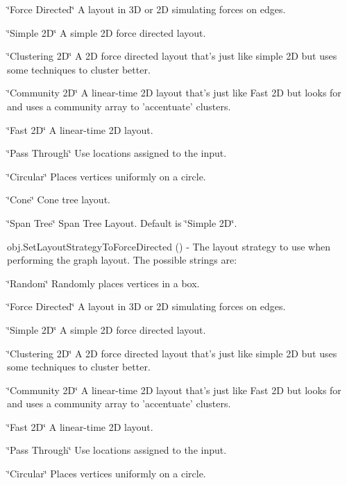 \begin{DoxyItemize}
\begin{DoxyItemize}
\item \char`\"{}\-Force Directed\char`\"{} A layout in 3\-D or 2\-D simulating forces on edges.
\item \char`\"{}\-Simple 2\-D\char`\"{} A simple 2\-D force directed layout.
\item \char`\"{}\-Clustering 2\-D\char`\"{} A 2\-D force directed layout that's just like simple 2\-D but uses some techniques to cluster better.
\item \char`\"{}\-Community 2\-D\char`\"{} A linear-\/time 2\-D layout that's just like Fast 2\-D but looks for and uses a community array to 'accentuate' clusters.
\item \char`\"{}\-Fast 2\-D\char`\"{} A linear-\/time 2\-D layout.
\item \char`\"{}\-Pass Through\char`\"{} Use locations assigned to the input.
\item \char`\"{}\-Circular\char`\"{} Places vertices uniformly on a circle.
\item \char`\"{}\-Cone\char`\"{} Cone tree layout.
\item \char`\"{}\-Span Tree\char`\"{} Span Tree Layout. Default is \char`\"{}\-Simple 2\-D\char`\"{}.  
\end{DoxyItemize}
\item {\ttfamily obj.\-Set\-Layout\-Strategy\-To\-Force\-Directed ()} -\/ The layout strategy to use when performing the graph layout. The possible strings are\-:
\begin{DoxyItemize}
\item \char`\"{}\-Random\char`\"{} Randomly places vertices in a box.
\item \char`\"{}\-Force Directed\char`\"{} A layout in 3\-D or 2\-D simulating forces on edges.
\item \char`\"{}\-Simple 2\-D\char`\"{} A simple 2\-D force directed layout.
\item \char`\"{}\-Clustering 2\-D\char`\"{} A 2\-D force directed layout that's just like simple 2\-D but uses some techniques to cluster better.
\item \char`\"{}\-Community 2\-D\char`\"{} A linear-\/time 2\-D layout that's just like Fast 2\-D but looks for and uses a community array to 'accentuate' clusters.
\item \char`\"{}\-Fast 2\-D\char`\"{} A linear-\/time 2\-D layout.
\item \char`\"{}\-Pass Through\char`\"{} Use locations assigned to the input.
\item \char`\"{}\-Circular\char`\"{} Places vertices uniformly on a circle.

\end{DoxyItemize}
\end{DoxyItemize}
